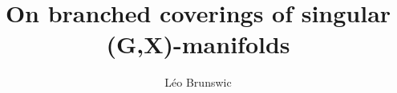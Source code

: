 \def\vecM{\overrightarrow{\E}^{1,2}}
\def\X{\overrightarrow X}
\def\Aut{\mathrm{Aut}}
\def\gradH{{\overrightarrow{\grad} \mathcal H_{\bar\kappa}}}
\def\Wild{\mathrm{Wild}}
\newcommand{\fonction}[5]{\displaystyle#1:\begin{array}{l|rcl}
& \displaystyle #2 & \longrightarrow & \displaystyle #3 \\
    & \displaystyle #4 & \longmapsto & \displaystyle #5 \end{array}}
\newcommand{\fonctiontrois}[9]{\displaystyle#1:\begin{array}{l|rcl}
& \displaystyle #2 & \longrightarrow & \displaystyle #3 \\
    & \displaystyle #4 & \longmapsto & \displaystyle #5\\
    & \displaystyle #6 & \longmapsto & \displaystyle #7\\
    & \displaystyle #8 & \longmapsto & \displaystyle #9\end{array}}    
\newcommand{\fonctionn}[4]{\displaystyle\begin{array}{l|rcl}
& \displaystyle #1 & \longrightarrow & \displaystyle #2 \\
    & \displaystyle #3 & \longmapsto & \displaystyle #4 \end{array}}

\newcommand{\fonctiondeux}[7]{\displaystyle#1:\begin{array}{l|rcl}
& \displaystyle #2 & \longrightarrow & \displaystyle #3 \\
	& \displaystyle #4 & \longmapsto & \displaystyle #5 \\ 
	& \displaystyle #6 & \longmapsto & \displaystyle #7\end{array}}	

\newcommand{\cyl}[1]{\CC_\infty^{(#1)}}

\newcommand{\edl}[1]{{\color{MyGreen}{#1}}}
\newcommand{\leo}[1]{{\color{MyGreen} [\textbf{Leo: } #1]}}

\newcommand{\edt}[1]{{\color{MyDarkRed}{#1}}}

%

\title{On branched coverings of singular (G,X)-manifolds}
\author{L\'eo Brunswic}
%  
\def\CatSpread{\mathbf{Spr}}
\def\CatSingGX{\mathbf{SingGX}}
\smartqed


